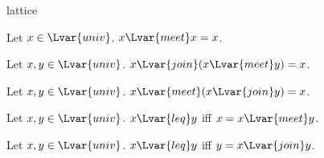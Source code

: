 \documentclass{stex}
\begin{document}
\begin{smodule}{lattice}
\begin{forthel}
    \begin{proposition*}
      Let $x \in \Lvar{univ}$.
      $x {\Lvar{meet}} x = x$.
    \end{proposition*}

    \begin{proposition*}
      Let $x, y \in \Lvar{univ}$.
      $x {\Lvar{join}} (x {\Lvar{meet}} y) = x$.
    \end{proposition*}

    \begin{proposition*}
      Let $x, y \in \Lvar{univ}$.
      $x {\Lvar{meet}} (x {\Lvar{join}} y) = x$.
    \end{proposition*}

    \begin{proposition*}
      Let $x, y \in \Lvar{univ}$.
      $x {\Lvar{leq}} y$ iff $x = x {\Lvar{meet}} y$.
    \end{proposition*}

    \begin{proposition*}
      Let $x, y \in \Lvar{univ}$.
      $x {\Lvar{leq}}y$ iff $y = x {\Lvar{join}} y$.
    \end{proposition*}
  \end{forthel}
\end{smodule}
\end{document}
